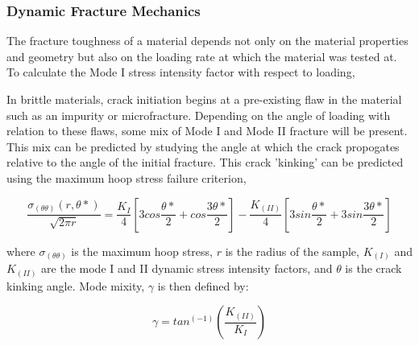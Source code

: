 \documentclass[12pt]{article}
\begin{document}
\subsubsection{Dynamic Fracture Mechanics} %

The fracture toughness of a material depends not only on the material properties and geometry but also on the loading rate at which the material was tested at. To calculate the Mode I stress intensity factor with respect to loading, 

In brittle materials, crack initiation begins at a pre-existing flaw in the material such as an impurity or microfracture. Depending on the angle of loading with relation to these flaws, some mix of Mode I and Mode II fracture will be present. This mix can be predicted by studying the angle at which the crack propogates relative to the angle of the initial fracture. This crack 'kinking' can be predicted using the maximum hoop stress failure criterion, 

\begin{equation}
\frac{\sigma_(\theta\theta)(r,\theta*)}{\sqrt{2\pi r}} = \frac{K_I}{4}[3cos\frac{\theta*}{2}+cos\frac{3\theta*}{2}]-\frac{K_(II)}{4}[3sin\frac{\theta*}{2}+3sin\frac{3\theta*}{2}]
\end{equation}

where $\sigma_(\theta\theta)$ is the maximum hoop stress, $r$ is the radius of the sample, $K_(I)$ and $K_(II)$ are the mode I and II dynamic stress intensity factors, and $\theta$ is the crack kinking angle. Mode mixity, $\gamma$ is then defined by:

\begin{equation}
\gamma = tan^(-1)(\frac{K_(II)}{K_I})
\end{equation}
\end{document}
